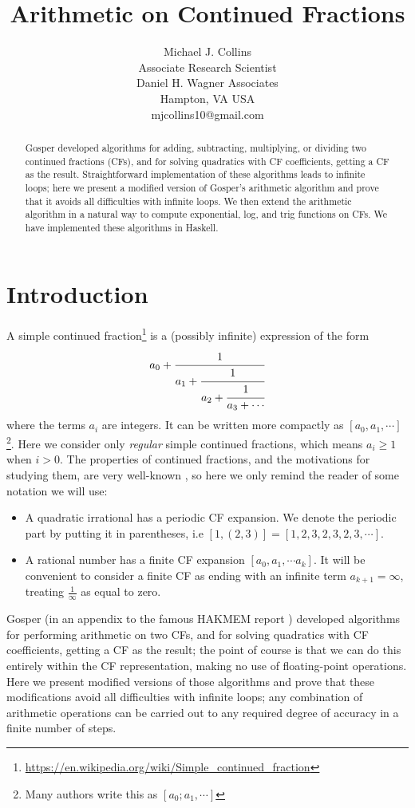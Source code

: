 \documentclass[11pt, oneside]{amsart}   	%
\title{Arithmetic on Continued Fractions}
\author{Michael J. Collins\\Associate Research Scientist\\Daniel H. Wagner Associates\\Hampton, VA USA\\mjcollins10@gmail.com}
\renewcommand{\:}{\negthickspace:\negthickspace}
\begin{document}
\begin{abstract}
Gosper  developed algorithms for adding, subtracting, multiplying, or dividing two continued fractions (CFs), and for solving quadratics with CF coefficients,
getting a CF as the result. Straightforward implementation of these algorithms leads to infinite loops; here we present a modified version of Gosper's arithmetic algorithm and prove that it avoids all difficulties with infinite loops. We then extend the arithmetic algorithm in a natural way to compute exponential, log, and trig functions on CFs.
We have implemented these algorithms in Haskell.
\end{abstract}

\maketitle

\section{Introduction}
A simple continued fraction\footnote{\href{https://en.wikipedia.org/wiki/Simple\_continued\_fraction}{https://en.wikipedia.org/wiki/Simple\_continued\_fraction}} is a (possibly infinite) expression of the form
\begin{equation*}
a_0+\cfrac{1}{a_1+\cfrac{1}{a_2+\cfrac{1}{a_3+\cdots}}}
\end{equation*}
where the terms $a_i$ are integers. It can be written more compactly as $[a_0, a_1, \cdots]$\footnote{Many authors write this as $[a_0; a_1, \cdots]$}. Here we consider only \emph{regular} simple continued fractions, which means $a_i \geq 1$ when $i>0$. The
properties of continued fractions, and the motivations for studying them, are very well-known \cite{rockett1992continued},
so here we only remind the reader of some notation we will use:
\begin{itemize}
\item A quadratic irrational has a periodic CF expansion. We denote the periodic part by putting it in parentheses,
i.e $[1,(2,3)] = [1,2,3,2,3,2,3,\cdots]$.
\item A rational number has a finite CF expansion $[a_0,a_1, \cdots a_k]$.
It will be convenient to consider a finite CF as ending with an infinite term $a_{k+1}=\infty$, treating $\frac{1}{\infty}$ as equal to zero.
\end{itemize}
 
Gosper (in an appendix to the famous HAKMEM report \cite{hakmem}) 
developed algorithms for performing arithmetic on two CFs, and for solving quadratics with CF coefficients, getting a CF as the result;
the point of course is that we can do this entirely within the CF representation, making no use of floating-point operations. Here we
present modified versions of those algorithms and prove that these modifications avoid all difficulties with infinite loops;
any combination of arithmetic operations can be carried out to any required degree of accuracy in a finite number of steps.
\end{document}
